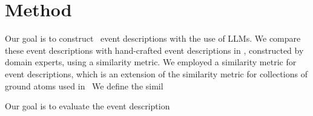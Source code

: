 \section{Method}\label{sec:method}

Our goal is to construct \rtec\ event descriptions with the use of LLMs.
%
We compare these event descriptions with hand-crafted event descriptions in \rtec, constructed by domain experts, using a similarity metric.
%
We employed a similarity metric for event descriptions, which is an extension of the similarity metric for collections of ground atoms used in~\cite{DBLP:journals/ml/MichelioudakisA19}
%
We define the simil

Our goal is to evaluate the event description
